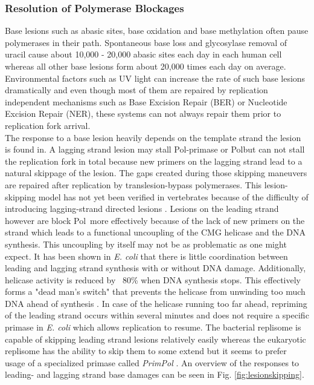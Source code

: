 \subsubsection{Resolution of Polymerase Blockages}
\label{sec:polblock}
Base lesions such as abasic sites, base oxidation and base methylation often pause polymerases in their path. Spontaneous base loss and glycosylase removal of uracil cause about 10,000 - 20,000 abasic sites each day in each human cell whereas all other base lesions form about 20,000 times each day on average. Environmental factors such as UV light can increase the rate of such base lesions dramatically and even though most of them are repaired by replication independent mechanisms such as Base Excision Repair (BER) or Nucleotide Excision Repair (NER), these systems can not always repair them prior to replication fork arrival.\\
The response to a base lesion heavily depends on the template strand the lesion is found in. A lagging strand lesion may stall Pol\textalpha-primase or Pol\textdelta but can not stall the replication fork in total because new primers on the lagging strand lead to a natural skippage of the lesion. The gaps created during those skipping maneuvers are repaired after replication by translesion-bypass polymerases. This lesion-skipping model has not yet been verified in vertebrates because of the difficulty of introducing lagging-strand directed lesions \citep{Goodman.2013}. Lesions on the leading strand however are block Pol\textalpha~more effectively because of the lack of new primers on the strand which leads to a functional uncoupling of the CMG helicase and the DNA synthesis. This uncoupling by itself may not be as problematic as one might expect. It has been shown in \textit{E. coli} that there is little coordination between leading and lagging strand synthesis with or without DNA damage. Additionally, helicase activity is reduced by ~80\% when DNA synthesis stops. This effectively forms a "dead man's switch" that prevents the helicase from unwinding too much DNA ahead of synthesis \citep{Goodman.2013,Marians.2018}. In case of the helicase running too far ahead, repriming of the leading strand occurs within several minutes and does not require a specific primase in \textit{E. coli} which allows replication to resume. The bacterial replisome is capable of skipping leading strand lesions relatively easily whereas the eukaryotic replisome has the ability to skip them to some extend but it seems to prefer usage of a specialized primase called \textit{PrimPol} \citep{Rechkoblit.2016}. An overview of the responses to leading- and lagging strand base damages can be seen in Fig. \ref{fig:lesionskipping}.
